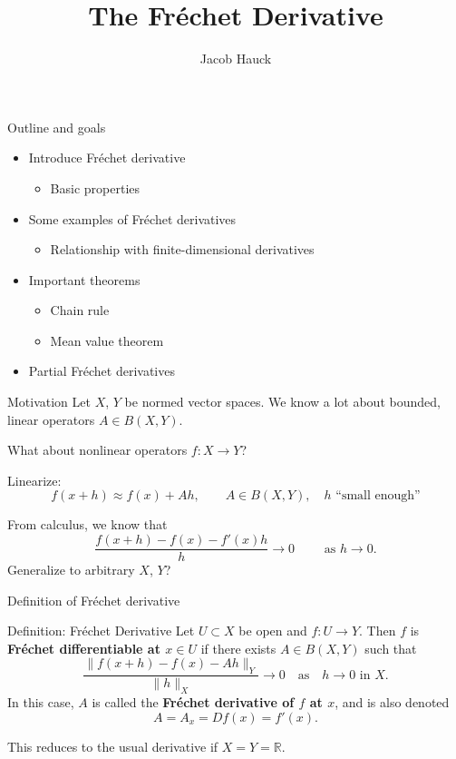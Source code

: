 \documentclass[]{beamer}
\title{The Fréchet Derivative}
\author{Jacob Hauck}
\institute{Math 6418}
\date{}
\begin{document}
	\frame{\titlepage}
	
	\begin{frame}{Outline and goals}
		\begin{itemize}
			\item Introduce Fréchet derivative
			\begin{itemize}
				\item Basic properties
			\end{itemize}
			\vfill
			\item Some examples of Fréchet derivatives 
			\begin{itemize}
				\item Relationship with finite-dimensional derivatives
			\end{itemize}
			\vfill
			\item Important theorems
			\begin{itemize}
				\item Chain rule
				\item Mean value theorem
			\end{itemize}
			\vfill
			\item Partial Fréchet derivatives
		\end{itemize}
	\end{frame}
	
	\begin{frame}{Motivation}
		Let $X$, $Y$ be normed vector spaces. We know a lot about bounded, linear operators $A \in B(X,Y)$.
		
		\vfill
		What about nonlinear operators $f : X \to Y$?
		\vfill
		
		Linearize:
		\begin{equation*}
			f(x+h) \approx f(x) + Ah, \qquad A \in B(X,Y),\quad h \text{ ``small enough''}
		\end{equation*}
		\vfill
		
		From calculus, we know that
		\begin{equation*}
			\frac{f(x+h) - f(x) - f'(x)h}{h} \to 0 \qquad \text{ as } h \to 0.
		\end{equation*}
		Generalize to arbitrary $X$, $Y$?
	\end{frame}
	
	\begin{frame}{Definition of Fréchet derivative}
		\begin{block}{Definition: Fréchet Derivative}
			Let $U \subset X$ be open and $f: U \to Y$. Then $f$ is \textbf{Fréchet differentiable at $x\in U$} if there exists $A \in B(X,Y)$ such that
			\begin{equation*}
				\frac{\lVert f(x+h) - f(x) - Ah\rVert_Y}{\lVert h \rVert_X} \to 0\quad \text{as}\quad h \to 0 \text{ in $X$}.
			\end{equation*}
			In this case, $A$ is called the \textbf{Fréchet derivative of $f$ at $x$}, and is also denoted
			\begin{equation*}
				A = A_x = Df(x) = f'(x).
			\end{equation*}
		\end{block}
		\vfill
		
		This reduces to the usual derivative if $X = Y = \mathbb{R}$.
	\end{frame}
	
\end{document}
